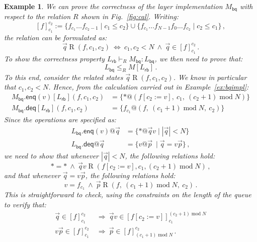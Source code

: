 \documentclass[11pt,oneside,draft]{book}
\newtheorem{example}[theorem]{Example}
\theoremstyle{definition}
\newcommand{\kw}[1]{\ensuremath{ \mathsf{#1} }}
\begin{document}
\begin{example} %
We can prove the correctness of
the layer implementation $M_\kw{bq}$
with respect to the relation $R$
shown in Fig.~\ref{fig:cal}.
Writing:
\[
  [f]_{c_1}^{c_2} :=
    \{ f_{c_1} \ldots f_{c_2 - 1} \mid c_1 \le c_2 \} \cup
    \{ f_{c_1} \ldots f_{N-1} f_0 \ldots f_{c_2} \mid c_2 \le c_1 \}
  \,,
\]
the relation can be formulated as:
\[
  \vec{q} \mathrel{R} (f, c_1, c_2)
  \: \Leftrightarrow \:
  c_1, c_2 < N
  \: \wedge \:
  \vec{q} \in [f]_{c_1}^{c_2}
  \,.
\]
To show the correctness property
$
  L_\kw{rb} \vdash_R M_\kw{bq} : L_\kw{bq}
$,
we then need to prove that:
\[
  L_\kw{bq} \le_R M[L_\kw{rb}]
  \,.
\]
To this end,
consider the related states
$\vec{q} \mathrel{R} (f, c_1, c_2)$.
We know in particular that $c_1, c_2 < N$.
Hence, from the calculation
carried out in Example~\ref{ex:bqimpl}:
\begin{align*}
  M_\kw{bq}.{\kw{enq}(v)}[L_\kw{rb}](f, c_1, c_2)
    &= \{ *@(f[c_2 := v], \:
          c_1, \:
          (c_2 + 1) \mathop{\mathrm{mod}} N) \}
  \\
  M_\kw{bq}.\kw{deq}[L_\kw{rb}](f, c_1, c_2)
    &= \{ f_{c_1}@(f, \:
          (c_1 + 1) \mathop{\mathrm{mod}} N, \:
          c_2) \}
\end{align*}
Since the operations are specified as:
\begin{align*}
  L_\kw{bq}.\kw{enq}(v)@\vec{q} &=
    \{ * @ \vec{q} v \mid |\vec{q}| < N \}
  \\
  L_\kw{bq}.\kw{deq}@\vec{q} &=
    \{ v @ \vec{p} \: \mid \vec{q} = v \vec{p} \}
  \,,
\end{align*}
we need to show that whenever
$|\vec{q}| < N$,
the following relations hold:
\[
  {*} = {*}
  \: \wedge \:
  \vec{q}v \mathrel{R}
    (f[c_2 := v], c_1, (c_2 + 1) \mathop{\mathrm{mod}} N)
  \,,
\]
and that whenever $\vec{q} = v\vec{p}$,
the following relations hold:
\[
  v = f_{c_1}
  \: \wedge \:
  \vec{p} \mathrel{R}
    (f, \:
     (c_1 + 1) \mathop{\mathrm{mod}} N, \:
     c_2)
  \,.
\]
This is straightforward to check,
using the constraints on the length of the queue
to verify that:
\begin{align*}
  \vec{q} \in [f]_{c_1}^{c_2}
    \: &\Rightarrow \:
    \vec{q}v \in [f[c_2 := v]]_{c_1}^{(c_2+1) \mathop{\mathrm{mod}} N}
  \\
  v\vec{p} \in [f]_{c_1}^{c_2}
    \: &\Rightarrow \:
    \vec{p} \in [f]_{(c_1+1) \mathop{\mathrm{mod}} N}^{c_2}
  \,.
\end{align*}
\end{example}
\end{document}
